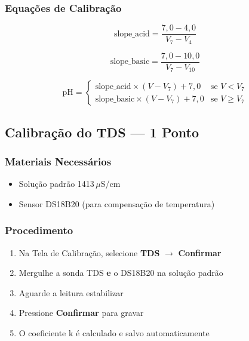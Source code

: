 \documentclass[12pt,a4paper]{article}
\begin{document}
\subsubsection{Equações de Calibração}

\begin{equation}
  \text{slope\_acid} = \frac{7{,}0 - 4{,}0}{V_7 - V_4}
  \label{eq:slope_acid}
\end{equation}

\begin{equation}
  \text{slope\_basic} = \frac{7{,}0 - 10{,}0}{V_7 - V_{10}}
  \label{eq:slope_basic}
\end{equation}

\begin{equation}
  \text{pH} = \begin{cases}
    \text{slope\_acid} \times (V - V_7) + 7{,}0 & \text{se } V < V_7 \\
    \text{slope\_basic} \times (V - V_7) + 7{,}0 & \text{se } V \geq V_7
  \end{cases}
  \label{eq:ph}
\end{equation}

\subsection{Calibração do TDS --- 1 Ponto}

\subsubsection{Materiais Necessários}
\begin{itemize}[nosep]
  \item Solução padrão 1413\,$\mu$S/cm
  \item Sensor DS18B20 (para compensação de temperatura)
\end{itemize}

\subsubsection{Procedimento}

\begin{enumerate}[nosep]
  \item Na Tela de Calibração, selecione \textbf{TDS} $\rightarrow$ \textbf{Confirmar}
  \item Mergulhe a sonda TDS \textbf{e} o DS18B20 na solução padrão
  \item Aguarde a leitura estabilizar
  \item Pressione \textbf{Confirmar} para gravar
  \item O coeficiente k é calculado e salvo automaticamente
\end{enumerate}
\end{document}
